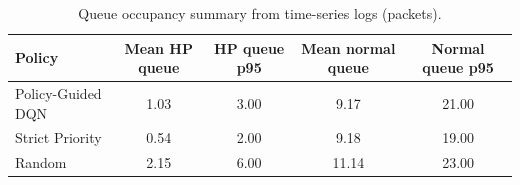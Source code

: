 \begin{table}[t]
\centering
\caption{Queue occupancy summary from time-series logs (packets).}
\label{tab:queue_summary}
\scriptsize
\begin{tabular}{lcccc}
\toprule
Policy & Mean HP queue & HP queue p95 & Mean normal queue & Normal queue p95 \\
\midrule
Policy-Guided DQN & 1.03 & 3.00 & 9.17 & 21.00 \\
Strict Priority & 0.54 & 2.00 & 9.18 & 19.00 \\
Random & 2.15 & 6.00 & 11.14 & 23.00 \\
\bottomrule
\end{tabular}
\end{table}
